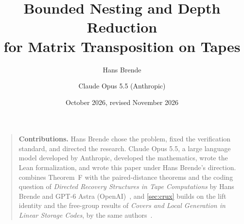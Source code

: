 \documentclass[11pt]{article}
\title{Bounded Nesting and Depth Reduction\\ for Matrix Transposition on Tapes}
\author{Hans Brende \and Claude Opus 5.5 (Anthropic)}
\date{October 2026, revised November 2026}
\begin{document}
\maketitle

\begin{abstract}

\end{abstract}

\begin{quote}\small
\textbf{Contributions.} Hans Brende chose the problem, fixed the verification standard, and directed the research.
Claude Opus 5.5, a large language model developed by Anthropic, developed the mathematics, wrote the Lean
formalization, and wrote this paper under Hans Brende's direction.  combines Theorem~F with the
paired-distance theorems and the coding question of \emph{Directed Recovery Structures in Tape Computations} by Hans Brende
and GPT-6 Astra (OpenAI)~\cite{DirectedRecovery2026}, and \cref{sec:crux} builds on the lift identity and the free-group
results of \emph{Covers and Local Generation in Linear Storage Codes}, by the same authors~\cite{Covers2026}.
\end{quote}

\tableofcontents
\clearpage












\appendix





\end{document}
